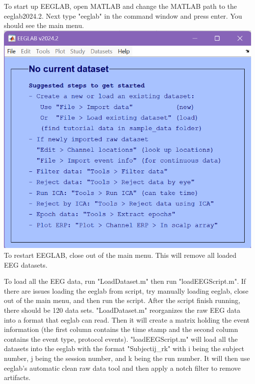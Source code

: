 \documentclass[12pt]{article}
\begin{document}
To start up EEGLAB, open MATLAB and change the MATLAB path to the eeglab2024.2. Next type "eeglab" in the command window and press enter. You should see the main menu.\newline
\includegraphics[scale=0.4]{EEGLABMainMenu}\newline
To restart EEGLAB, close out of the main menu. This will remove all loaded EEG datasets.

To load all the EEG data, run "LoadDataset.m" then run "loadEEGScript.m". If there are issues loading the eeglab from script, try manually loading eeglab, close out of the main menu, and then run the script. After the script finish running, there should be 120 data sets.
"LoadDataset.m" reorganizes the raw EEG data into a format that eeglab can read. Then it will create a matrix holding the event information (the first column contains the time stamp and the second column contains the event type, protocol events).
"loadEEGScript.m" will load all the datasets into the eeglab with the format "Subjectij\_rk" with i being the subject number, j being the session number, and k being the run number. It will then use eeglab's automatic clean raw data tool and then apply a notch filter to remove artifacts.
\end{document}
